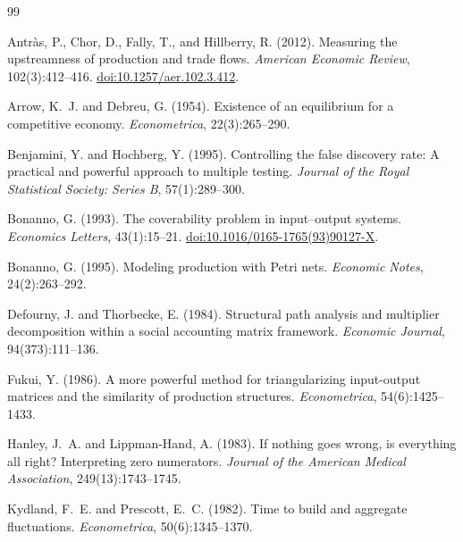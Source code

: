 \documentclass[11pt]{article}
\begin{document}
\begin{thebibliography}{99}

Antr{\`a}s, P., Chor, D., Fally, T., and Hillberry, R. (2012). Measuring the upstreamness of production and trade flows. \emph{American Economic Review}, 102(3):412--416. \href{https://doi.org/10.1257/aer.102.3.412}{doi:10.1257/aer.102.3.412}.

Arrow, K.~J. and Debreu, G. (1954). Existence of an equilibrium for a competitive economy. \emph{Econometrica}, 22(3):265--290.

Benjamini, Y. and Hochberg, Y. (1995). Controlling the false discovery rate: A practical and powerful approach to multiple testing. \emph{Journal of the Royal Statistical Society: Series B}, 57(1):289--300.

Bonanno, G. (1993). The coverability problem in input--output systems. \emph{Economics Letters}, 43(1):15--21. \href{https://doi.org/10.1016/0165-1765(93)90127-X}{doi:10.1016/0165-1765(93)90127-X}.

Bonanno, G. (1995). Modeling production with Petri nets. \emph{Economic Notes}, 24(2):263--292.

Defourny, J. and Thorbecke, E. (1984). Structural path analysis and multiplier decomposition within a social accounting matrix framework. \emph{Economic Journal}, 94(373):111--136.

Fukui, Y. (1986). A more powerful method for triangularizing input-output matrices and the similarity of production structures. \emph{Econometrica}, 54(6):1425--1433.

Hanley, J.~A. and Lippman-Hand, A. (1983). If nothing goes wrong, is everything all right? Interpreting zero numerators. \emph{Journal of the American Medical Association}, 249(13):1743--1745.

Kydland, F.~E. and Prescott, E.~C. (1982). Time to build and aggregate fluctuations. \emph{Econometrica}, 50(6):1345--1370.


\end{thebibliography}
\end{document}
